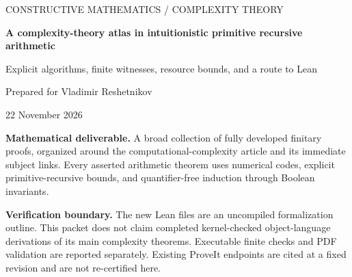 \documentclass[11pt,oneside]{article}
\theoremstyle{definition}
\begin{document}
\begin{titlepage}
\thispagestyle{empty}
\vspace*{1cm}
{\Large\color{blue!45!black} CONSTRUCTIVE MATHEMATICS / COMPLEXITY THEORY\par}
\vspace{1cm}
{\huge\bfseries A complexity-theory atlas in intuitionistic primitive recursive arithmetic\par}
\vspace{0.7cm}
{\Large Explicit algorithms, finite witnesses, resource bounds, and a route to Lean\par}
\vspace{1.2cm}
{\large Prepared for Vladimir Reshetnikov\par}
{\large 22 November 2026\par}
\vfill
\begin{minipage}{0.94\textwidth}
\textbf{Mathematical deliverable.} A broad collection of fully developed finitary proofs, organized around the computational-complexity article and its immediate subject links. Every asserted arithmetic theorem uses numerical codes, explicit primitive-recursive bounds, and quantifier-free induction through Boolean invariants.

\medskip
\textbf{Verification boundary.} The new Lean files are an uncompiled formalization outline. This packet does not claim completed kernel-checked object-language derivations of its main complexity theorems. Executable finite checks and PDF validation are reported separately. Existing ProveIt endpoints are cited at a fixed revision and are not re-certified here.
\end{minipage}
\vspace{0.7cm}
\end{titlepage}
\tableofcontents
\newpage












\end{document}
